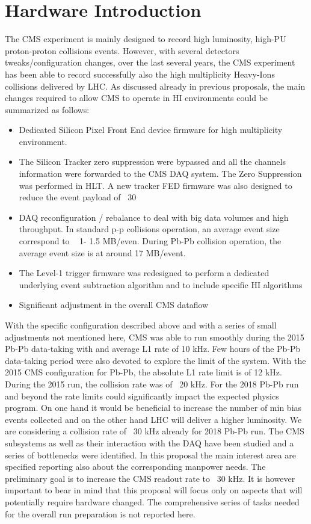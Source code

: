 \newpage

\section{Hardware Introduction\label{sec:HWintro}}
The CMS experiment is mainly designed to record high luminosity, high-PU proton-proton collisions events.  However, with
several detectors tweaks/configuration changes, over the last several years, the CMS experiment has been able to record
successfully also the high multiplicity Heavy-Ions collisions delivered by LHC. As discussed already in previous
proposals, the main changes required to allow CMS to operate in HI environments could be summarized as follows:

\begin{itemize}
\item Dedicated Silicon Pixel Front End device firmware for high multiplicity environment. 
\item The Silicon Tracker zero suppression were bypassed and all the channels information were forwarded to the CMS DAQ system. The Zero Suppression was performed in HLT. A new tracker FED firmware was also designed to reduce the event payload of ~30%
\item DAQ reconfiguration / rebalance to deal with big data volumes and high throughput. In standard p-p collisions operation, an average event size correspond to ~ 1- 1.5 MB/even. During Pb-Pb collision operation, the average event size is at around 17 MB/event. 
\item The Level-1 trigger firmware was redesigned to perform a dedicated underlying event subtraction algorithm and to include specific HI algorithms 
\item Significant adjustment in the overall CMS dataflow
\end{itemize}


With the specific configuration described above and with a series of small adjustments not mentioned here, CMS was able
to run smoothly during the 2015 Pb-Pb data-taking with and average L1 rate of 10 kHz. Few hours of the Pb-Pb data-taking
period were also devoted to explore the limit of the system.  With the 2015  CMS configuration for Pb-Pb, the absolute
L1 rate limit is of 12 kHz. During the 2015 run, the collision rate was of ~20 kHz. For the 2018 Pb-Pb run and beyond
the rate limits could significantly impact the expected physics program. On one hand it would be beneficial to increase
the number of min bias events collected and on the other hand LHC will deliver a higher luminosity. We are considering a
collision rate of ~30 kHz already for 2018 Pb-Pb run. The CMS subsystems as well as their interaction with the DAQ have
been studied and a series of bottlenecks were identified. In this proposal the main interest area are specified
reporting also about the corresponding manpower needs. The preliminary goal is to increase the CMS readout rate to ~30
kHz. It is however important to bear in mind that this proposal will focus only on aspects that will potentially require
hardware changed.  The comprehensive series of tasks needed for the overall run preparation is not reported here. 

